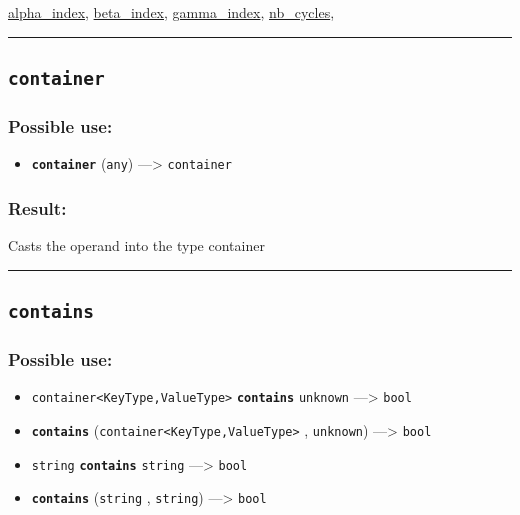 \documentclass[]{book}
\providecommand{\tightlist}{%
  \setlength{\itemsep}{0pt}\setlength{\parskip}{0pt}}
\theoremstyle{definition}
\theoremstyle{definition}
\theoremstyle{definition}
\theoremstyle{remark}
\begin{document}
\href{operators-a-to-a.html\#alpha_index}{alpha\_index},
\href{operators-b-to-c.html\#beta_index}{beta\_index},
\href{operators-d-to-h.html\#gamma_index}{gamma\_index},
\href{operators-n-to-r.html\#nb_cycles}{nb\_cycles},

\begin{center}\rule{0.5\linewidth}{\linethickness}\end{center}

\subsection{\texorpdfstring{\texttt{container}}{container}}\label{container}

\subsubsection{Possible use:}\label{possible-use-98}

\begin{itemize}
\tightlist
\item
  \textbf{\texttt{container}} (\texttt{any}) ---\textgreater{}
  \texttt{container}
\end{itemize}

\subsubsection{Result:}\label{result-96}

Casts the operand into the type container

\begin{center}\rule{0.5\linewidth}{\linethickness}\end{center}

\subsection{\texorpdfstring{\texttt{contains}}{contains}}\label{contains}

\subsubsection{Possible use:}\label{possible-use-99}

\begin{itemize}
\tightlist
\item
  \texttt{container\textless{}KeyType,ValueType\textgreater{}}
  \textbf{\texttt{contains}} \texttt{unknown} ---\textgreater{}
  \texttt{bool}
\item
  \textbf{\texttt{contains}}
  (\texttt{container\textless{}KeyType,ValueType\textgreater{}} ,
  \texttt{unknown}) ---\textgreater{} \texttt{bool}
\item
  \texttt{string} \textbf{\texttt{contains}} \texttt{string}
  ---\textgreater{} \texttt{bool}
\item
  \textbf{\texttt{contains}} (\texttt{string} , \texttt{string})
  ---\textgreater{} \texttt{bool}
\end{itemize}
\end{document}
